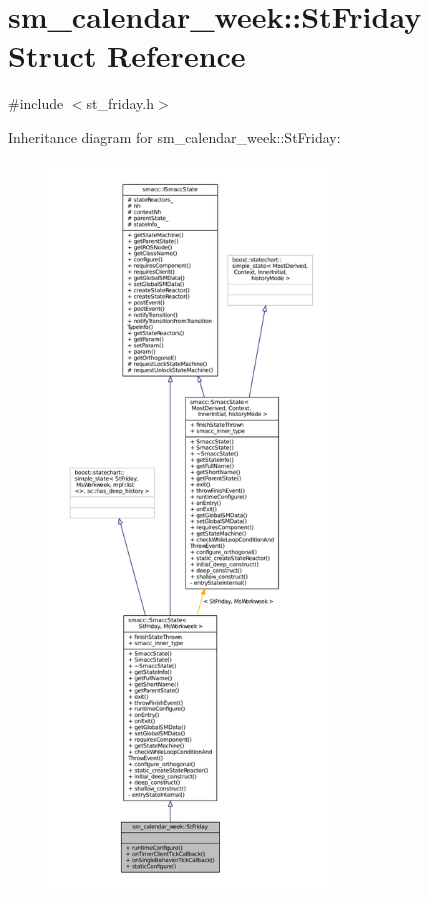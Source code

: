 \hypertarget{structsm__calendar__week_1_1StFriday}{}\section{sm\+\_\+calendar\+\_\+week\+:\+:St\+Friday Struct Reference}
\label{structsm__calendar__week_1_1StFriday}


{\ttfamily \#include $<$st\+\_\+friday.\+h$>$}



Inheritance diagram for sm\+\_\+calendar\+\_\+week\+:\+:St\+Friday\+:
\nopagebreak
\begin{figure}[H]
\begin{center}
\leavevmode
\includegraphics[height=550pt]{structsm__calendar__week_1_1StFriday__inherit__graph}
\end{center}
\end{figure}



